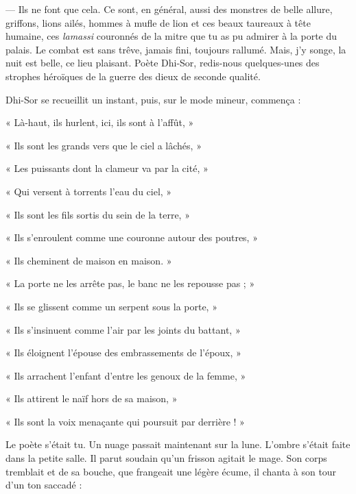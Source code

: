 \documentclass[a4paper, 11pt, oneside, polutonikogreek, french]{article}
\begin{document}
--- Ils ne font que cela. Ce sont, en général, aussi des monstres de belle allure, griffons, lions ailés, hommes à mufle de lion et ces beaux taureaux à tête humaine, ces \emph{lamassi} couronnés de la mitre que tu as pu admirer à la porte du palais. Le combat est sans trêve, jamais fini, toujours rallumé. Mais, j'y songe, la nuit est belle, ce lieu plaisant. Poète Dhi-Sor, redis-nous quelques-unes des strophes héroïques de la guerre des dieux de seconde qualité.

\bigskip
\centerline{\EightStarTaper}
\centerline{\EightStarTaper\EightStarTaper}
\bigskip

Dhi-Sor se recueillit un instant, puis, sur le mode mineur, commença :

« Là-haut, ils hurlent, ici, ils sont à l'affût, »

« Ils sont les grands vers que le ciel a lâchés, »

« Les puissants dont la clameur va par la cité, »

« Qui versent à torrents l'eau du ciel, »

« Ils sont les fils sortis du sein de la terre, »

« Ils s'enroulent comme une couronne autour des poutres, »

« Ils cheminent de maison en maison. »

« La porte ne les arrête pas, le banc ne les repousse pas ; »

« Ils se glissent comme un serpent sous la porte, »

« Ils s'insinuent comme l'air par les joints du battant, »

« Ils éloignent l'épouse des embrassements de l'époux, »

« Ils arrachent l'enfant d'entre les genoux de la femme, »

« Ils attirent le naïf hors de sa maison, »

« Ils sont la voix menaçante qui poursuit par derrière ! »

\bigskip
\centerline{\EightStarTaper}
\centerline{\EightStarTaper\EightStarTaper}
\bigskip

Le poète s'était tu. Un nuage passait maintenant sur la lune. L'ombre s'était faite dans la petite salle. Il parut soudain qu'un frisson agitait le mage. Son corps tremblait et de sa bouche, que frangeait une légère écume, il chanta à son tour d'un ton saccadé :

\bigskip
\centerline{\EightStarTaper}
\centerline{\EightStarTaper\EightStarTaper}
\bigskip
\end{document}
